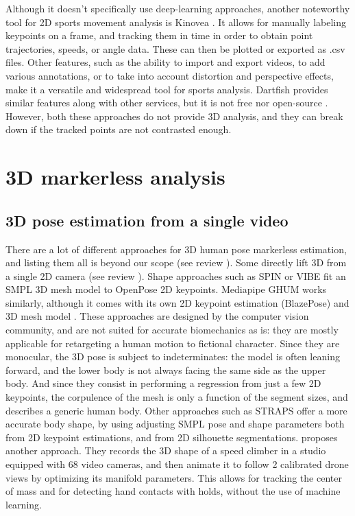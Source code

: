 Although it doesn't specifically use deep-learning approaches, another noteworthy tool for 2D sports movement analysis is Kinovea \cite{Kinovea,Fernandez2020}. It allows for manually labeling keypoints on a frame, and tracking them in time in order to obtain point trajectories, speeds, or angle data. These can then be plotted or exported as .csv files. Other features, such as the ability to import and export videos, to add various annotations, or to take into account distortion and perspective effects, make it a versatile and widespread tool for sports analysis. Dartfish provides similar features along with other services, but it is not free nor open-source \cite{Dartfish}. However, both these approaches do not provide 3D analysis, and they can break down if the tracked points are not contrasted enough. 

\FloatBarrier
\section{3D markerless analysis} 
\subsection{3D pose estimation from a single video}

There are a lot of different approaches for 3D human pose markerless estimation, and listing them all is beyond our scope (see review \cite{Wang2021a}). Some directly lift 3D from a single 2D camera (see review \cite{Liu2022b}). Shape approaches such as SPIN \cite{Kolotouros2019} or VIBE \cite{Kocabas2020} fit an SMPL 3D mesh model \cite{Loper2015} to OpenPose 2D keypoints. Mediapipe GHUM works similarly, although it comes with its own 2D keypoint estimation (BlazePose) and 3D mesh model \cite{Xu2020b}. These approaches are designed by the computer vision community, and are not suited for accurate biomechanics as is: they are mostly applicable for retargeting a human motion to fictional character. Since they are monocular, the 3D pose is subject to indeterminates: the model is often leaning forward, and the lower body is not always facing the same side as the upper body. And since they consist in performing a regression from just a few 2D keypoints, the corpulence of the mesh is only a function of the segment sizes, and describes a generic human body. Other approaches such as STRAPS \cite{Sengupta2020} offer a more accurate body shape, by using adjusting SMPL pose and shape parameters both from 2D keypoint estimations, and from 2D silhouette segmentations. \cite{Reveret2020} proposes another approach. They records the 3D shape of a speed climber in a studio equipped with 68 video cameras, and then animate it to follow 2 calibrated drone views by optimizing its manifold parameters. This allows for tracking the center of mass and for detecting hand contacts with holds, without the use of machine learning. 

